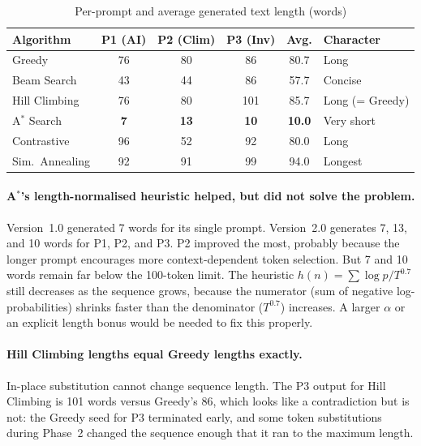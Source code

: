 \documentclass[12pt]{article}
\begin{document}
\begin{table}[ht]
	\centering
	\caption{Per-prompt and average generated text length (words)}
	\label{tab:length_boxed}
	\small
	\setlength{\tabcolsep}{3pt}
	\begin{tabularx}{\linewidth}{|X|c|c|c|c|X|}
		\hline
		\textbf{Algorithm} & \textbf{P1 (AI)} & \textbf{P2 (Clim)} & \textbf{P3 (Inv)} & \textbf{Avg.} & \textbf{Character} \\ \hline
		Greedy          & 76  & 80  & 86  & 80.7 & Long \\ \hline
		Beam Search     & 43  & 44  & 86  & 57.7 & Concise \\ \hline
		Hill Climbing   & 76  & 80  & 101 & 85.7 & Long (= Greedy) \\ \hline
		A$^*$ Search    & \textbf{7} & \textbf{13} & \textbf{10} & \textbf{10.0} & Very short \\ \hline
		Contrastive     & 96  & 52  & 92  & 80.0 & Long \\ \hline
		Sim.\ Annealing & 92  & 91  & 99  & 94.0 & Longest \\ \hline
	\end{tabularx}
\end{table}
	
	\paragraph{A$^*$'s length-normalised heuristic helped, but did not solve the problem.}
	Version~1.0 generated 7 words for its single prompt. Version~2.0 generates 7, 13, and 10 words for P1, P2, and P3. P2 improved the most, probably because the longer prompt encourages more context-dependent token selection. But 7 and 10 words remain far below the 100-token limit. The heuristic $h(n) = \sum \log p / T^{0.7}$ still decreases as the sequence grows, because the numerator (sum of negative log-probabilities) shrinks faster than the denominator ($T^{0.7}$) increases. A larger $\alpha$ or an explicit length bonus would be needed to fix this properly.
	
	\paragraph{Hill Climbing lengths equal Greedy lengths exactly.}
	In-place substitution cannot change sequence length. The P3 output for Hill Climbing is 101 words versus Greedy's 86, which looks like a contradiction but is not: the Greedy seed for P3 terminated early, and some token substitutions during Phase~2 changed the sequence enough that it ran to the maximum length.
	
\end{document}
